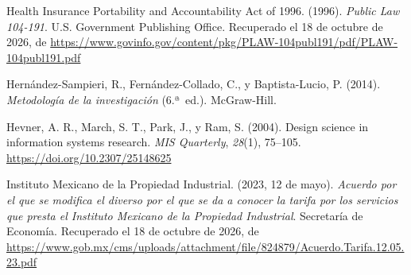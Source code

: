 \documentclass[12pt, a4paper]{article}
\begin{document}
\begin{list}{}{\setlength{\leftmargin}{1.27cm}\setlength{\itemindent}{-1.27cm}%
  \setlength{\labelwidth}{0pt}\setlength{\labelsep}{0pt}\setlength{\itemsep}{6pt}}

\item Health Insurance Portability and Accountability Act of
  1996. (1996). \textit{Public Law 104-191}. U.S. Government
  Publishing Office.
  Recuperado el 18 de octubre de 2026, de \url{https://www.govinfo.gov/content/pkg/PLAW-104publ191/pdf/PLAW-104publ191.pdf}


\item Hernández-Sampieri, R., Fernández-Collado, C., y
  Baptista-Lucio, P. (2014). \textit{Metodología de la
   investigación} (6.ª~ed.). McGraw-Hill.
 


\item Hevner, A. R., March, S. T., Park, J., y Ram, S. (2004).
  Design science in information systems research.
  \textit{MIS Quarterly}, \textit{28}(1), 75--105.
  \url{https://doi.org/10.2307/25148625}



\item Instituto Mexicano de la Propiedad Industrial. (2023, 12 de
  mayo). \textit{Acuerdo por el que se modifica el diverso por el que
  se da a conocer la tarifa por los servicios que presta el Instituto
  Mexicano de la Propiedad Industrial}. Secretaría de Economía. Recuperado el 18 de octubre de 2026, de \url{https://www.gob.mx/cms/uploads/attachment/file/824879/Acuerdo.Tarifa.12.05.23.pdf}
 

\end{list}
\end{document}
